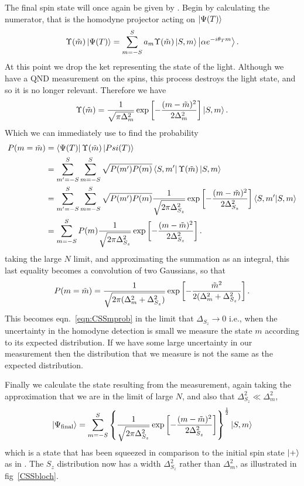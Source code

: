 The final spin state will once again be given by
. Begin by calculating the numerator, that is
the homodyne projector acting on $\ket{\Psi(T)}$
%
\begin{equation}
  \Upsilon(\tilde{m})\ket{\Psi(T)} =
  \sum_{m=-S}^{S}a_m\Upsilon(\tilde{m})\ket{S,m}\ket{\alpha e^{-i\theta_T m}}.
\end{equation}
%
At this point we drop the ket representing the state of the light. Although we
have a QND measurement on the spins, this process destroys the light state, and
so it is no longer relevant. Therefore we have
%
\begin{equation}
  \Upsilon(\tilde{m}) = \frac{1}{\sqrt{\pi\Delta_m^2}}\exp\left[
    -\frac{(m-\tilde{m})^2}{2\Delta_m^2}\right]\ket{S,m}.
\end{equation}
%
Which we can immediately use to find the probability
%
\begin{align}
  P(m=\tilde{m}) &= \bra{\Psi(T)}\Upsilon(\tilde{m})\ket{Psi(T)}\\
  & = \sum_{m'=-S}^S \sum_{m=-S}^S \sqrt{P(m')P(m)}\bra{S,
  m'}\Upsilon(\tilde{m})\ket{S, m} \\
  & = \sum_{m'=-S}^S \sum_{m=-S}^S \sqrt{P(m')P(m)}
  \frac{1}{\sqrt{2\pi\Delta_{S_z}^2}}\exp\left[-\frac{(m-\tilde{m})^2}{2\Delta_{S_z}^2}\right] 
  \bra{S, m'}\ket{S, m} \\
  &= \sum_{m=-S}^{S} P(m) 
  \frac{1}{\sqrt{2\pi\Delta_{S_z}^2}}\exp\left[-\frac{(m-\tilde{m})^2}{2\Delta_{S_z}^2}\right] .
\end{align}
%
taking the large $N$ limit, and approximating the summation as an integral,
this last equality becomes a convolution of two Gaussians, so that
%
\begin{equation}
  P(m=\tilde{m}) = \frac{1}{\sqrt{2\pi(\Delta_m^2 + \Delta_{S_z}^2)}}\exp\left[
    -\frac{\tilde{m}^2}{2(\Delta_m^2 + \Delta_{S_z}^2)}\right].
\end{equation}
%
This becomes eqn.~\ref{eqn:CSSmprob} in the limit that $\Delta_{S_z} \to 0$
i.e., when the uncertainty in the homodyne detection is small we measure the
state $m$ according to its expected distribution. If we have some large
uncertainty in our measurement then the distribution that we measure is not the
same as the expected distribution.

Finally we calculate the state resulting from the measurement, again taking the
approximation that we are in the limit of large $N$, and also that
$\Delta_{S_z}^2 \ll \Delta_m^2$,
%
\begin{equation}
  \ket{\Psi_\text{final}} =
  \sum_{m=-S}^S\left\{\frac{1}{\sqrt{2\pi\Delta_{S_z}^2}} \exp\left[-\frac{(m -
  \tilde{m})^2}{2\Delta_{S_z}^2}\right]\right\}^\frac{1}{2} \ket{S,m}
\end{equation}
%
which is a state that has been squeezed in comparison to the initial spin state
$\ket{+}$ as in . The $S_z$ distribution now has
a width $\Delta_{S_z}^2$ rather than $\Delta_m^2$, as illustrated in
fig~\ref{CSSbloch}.


